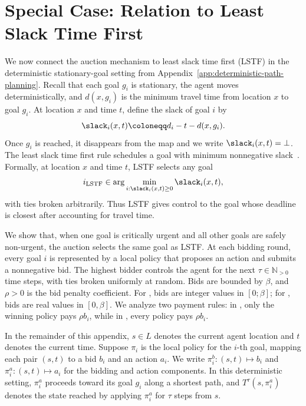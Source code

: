 \section{Special Case: Relation to Least Slack Time First}
\label{app:lstf-analysis}

We now connect the auction mechanism to least slack time first (LSTF) in the deterministic stationary-goal setting from Appendix~\ref{app:deterministic-path-planning}.
Recall that each goal \(g_i\) is stationary, the agent moves deterministically, and \(d(x,g_i)\) is the minimum travel time from location \(x\) to goal \(g_i\).
At location \(x\) and time \(t\), define the slack of goal \(i\) by
\[
  \slack_i(x,t)\coloneqq d_i-t-d(x,g_i).
\]
Once \(g_i\) is reached, it disappears from the map and we write \(\slack_i(x,t)=\bot\).
The least slack time first rule schedules a goal with minimum nonnegative slack~\citep{brown2020optimal}.
Formally, at location \(x\) and time \(t\), LSTF selects any goal
\[
  i_{\mathrm{LSTF}}\in
  \arg\min_{i:\slack_i(x,t)\geq 0}
  \slack_i(x,t),
\]
with ties broken arbitrarily.
Thus LSTF gives control to the goal whose deadline is closest after accounting for travel time.

We show that, when one goal is critically urgent and all other goals are safely non-urgent, the auction selects the same goal as LSTF.
At each bidding round, every goal \(i\) is represented by a local policy that proposes an action and submits a nonnegative bid.
The highest bidder controls the agent for the next \(\tau\in\mathbb{N}_{>0}\) time steps, with ties broken uniformly at random.
Bids are bounded by \(\beta\), and \(\rho>0\) is the bid penalty coefficient.
For \poorman, bids are integer values in \([0;\beta]\); for \allpay, bids are real values in \([0,\beta]\).
We analyze two payment rules: in \poorman, only the winning policy pays \(\rho b_i\), while in \allpay, every policy pays \(\rho b_i\).

In the remainder of this appendix, \(s\in L\) denotes the current agent location and \(t\) denotes the current time.
Suppose \(\pi_i\) is the local policy for the \(i\)-th goal, mapping each pair \((s,t)\) to a bid \(b_i\) and an action \(a_i\).
We write \(\pi_i^b\colon (s,t)\mapsto b_i\) and \(\pi_i^a\colon (s,t)\mapsto a_i\) for the bidding and action components.
In this deterministic setting, \(\pi_i^a\) proceeds toward its goal \(g_i\) along a shortest path, and \(T^\tau(s,\pi_i^a)\) denotes the state reached by applying \(\pi_i^a\) for \(\tau\) steps from \(s\).

